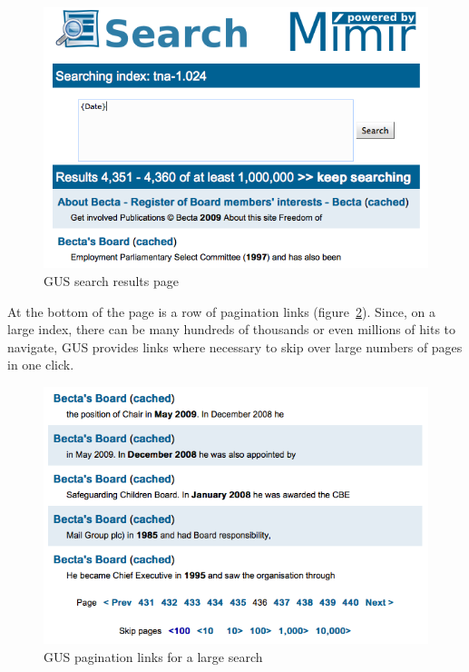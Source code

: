 \begin{figure}[tbp]
\begin{center}
\includegraphics[scale=0.5]{img/gus-search-results}
\caption{GUS search results page}
\label{fig:gus:results}
\end{center}
\end{figure}

At the bottom of the page is a row of pagination links
(figure~\ref{fig:gus:pagination}).  Since, on a large index, there can be many
hundreds of thousands or even millions of hits to navigate, GUS provides links
where necessary to skip over large numbers of pages in one click.

\begin{figure}[tbp]
\begin{center}
\includegraphics[scale=0.5]{img/gus-pagination-links}
\caption{GUS pagination links for a large search}
\label{fig:gus:pagination}
\end{center}
\end{figure}


